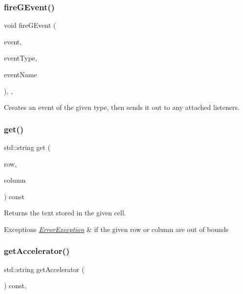 \subsubsection{\texorpdfstring{fire\+G\+Event()}{fireGEvent()}\hspace{0.1cm}{\footnotesize\ttfamily [8/8]}}
{\footnotesize\ttfamily void fire\+G\+Event (\begin{DoxyParamCaption}\item[{Q\+Window\+State\+Change\+Event $\ast$}]{event,  }\item[{Event\+Type}]{event\+Type,  }\item[{const std\+::string \&}]{event\+Name }\end{DoxyParamCaption})\hspace{0.3cm}{\ttfamily [protected]}, {\ttfamily [virtual]}, {\ttfamily [inherited]}}



Creates an event of the given type, then sends it out to any attached listeners. 

\mbox{\label{classGTable_aaa9971dcb7e1b082abd3b9010667f041}} 
\subsubsection{\texorpdfstring{get()}{get()}}
{\footnotesize\ttfamily std\+::string get (\begin{DoxyParamCaption}\item[{int}]{row,  }\item[{int}]{column }\end{DoxyParamCaption}) const\hspace{0.3cm}{\ttfamily [virtual]}}



Returns the text stored in the given cell. 


\begin{DoxyExceptions}{Exceptions}
{\em \mbox{\hyperlink{classErrorException}{Error\+Exception}}} & if the given row or column are out of bounds \\
\hline
\end{DoxyExceptions}
\mbox{\label{classGInteractor_a69f8d23ed8f207fbecad99960776e942}} 
\subsubsection{\texorpdfstring{get\+Accelerator()}{getAccelerator()}}
{\footnotesize\ttfamily std\+::string get\+Accelerator (\begin{DoxyParamCaption}{ }\end{DoxyParamCaption}) const\hspace{0.3cm}{\ttfamily [virtual]}, {\ttfamily [inherited]}}



